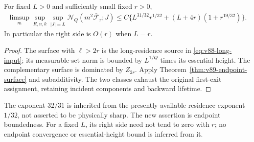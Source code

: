 \begin{corollary}
\label{cor:v89-full-critical}
For fixed $L>0$ and sufficiently small fixed $r>0$,
\begin{align}
 \limsup_m\sup_{R,n,k}\sup_{|J|=L}
       \mathcal N_Q(m^2\overline{\mathcal F}_r;J)
 \le C\{L^{31/32}r^{1/32}+(L+4r)(1+r^{19/32})\}.
                                      \label{eq:v89-full-critical}
\end{align}
In particular the right side is $O(r)$ when $L=r$.
\end{corollary}
\begin{proof}
The surface with $\ell>2r$ is the long-residence source in
\eqref{eq:v88-long-input}; its measurable-set norm is bounded by
$L^{1/Q}$ times its essential height. The complementary surface
is dominated by $Z_{2r}$. Apply Theorem~\ref{thm:v89-endpoint-surface}
and subadditivity. The two classes exhaust the original first-exit
assignment, retaining incident components and backward lifetime.
\end{proof}

The exponent $32/31$ is inherited from the presently available
residence exponent $1/32$, not asserted to be physically sharp.
The new assertion is endpoint boundedness. For a fixed $L$, its
right side need not tend to zero with $r$; no endpoint convergence
or essential-height bound is inferred from it.
